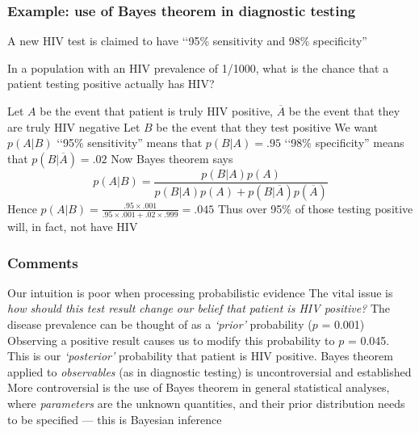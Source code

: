  \begin{frame}[t]

\frametitle{Example: use of Bayes theorem in diagnostic testing}

A new HIV test is claimed to have \lq\lq 95\% sensitivity and 98\% specificity''

In a population with an HIV prevalence of 1/1000, what
is the chance that a patient testing positive actually has HIV?

\bi
\I Let $A$ be the event that patient is truly HIV positive,
$\overline{A}$ be the event that they are truly HIV negative
\I Let $B$ be the event that they test positive
\I We want $p(A|B)$
\I \lq\lq95\% sensitivity'' means that $p(B|A) = .95$
\I \lq\lq98\% specificity'' means that $p(B|\overline{A}) = .02$
\I Now Bayes theorem says $$ p(A|B) = \frac{ p(B|A) p(A) } {p(B|A) p(A) + p(B|\overline{A}) p(\overline{A}) }$$
\I Hence  $ p(A|B) = \frac{ .95 \times .001 } {.95 \times  .001 + .02 \times.999 } = .045 $
\I Thus over 95\% of those testing positive will, in fact, not have HIV
\ei
\end{frame}



\begin{frame}[t]

\frametitle{Comments}

\bibig
\I Our intuition is poor when processing probabilistic evidence\vspace{1mm}
\I The vital issue is {\it how should this test result change our belief
   that patient is HIV positive?}\vspace{1mm}
\I The disease prevalence can be thought of as a {\it \lq prior'} probability ($p$ = 0.001)\vspace{1mm}
\I Observing a positive result causes us to modify this probability to $p$ = 0.045.
   This is our {\it \lq posterior'} probability that patient is HIV positive.\vspace{1mm}
\I Bayes theorem applied to {\it observables} (as in diagnostic testing)
   is uncontroversial and established\vspace{1mm}
\I More controversial is the use of Bayes theorem in general statistical analyses,
   where {\it parameters} are the unknown quantities, and their prior distribution
   needs to be specified --- this is \alert{Bayesian inference}
\eibig
\end{frame}


